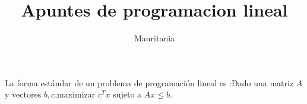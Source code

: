 \documentclass{article}
\title{Apuntes de programacion lineal}.
\author{Mauritania}
\begin{document}
\maketitle

La forma estándar de un problema de programación lineal es :Dado una
matriz $A$ y vectores $b,c$,maximizar  $c^Tx$ sujeto a $Ax\leq b$.
\end{document}
